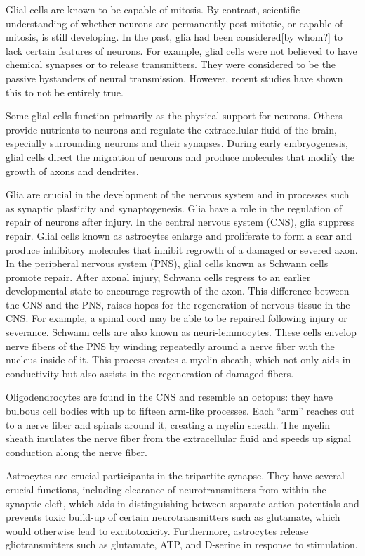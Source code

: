 \documentclass[]{book}
\begin{document}
Glial cells are known to be capable of mitosis. By contrast, scientific understanding of whether neurons are permanently post-mitotic, or capable of mitosis, is still developing. In the past, glia had been considered{[}by whom?{]} to lack certain features of neurons. For example, glial cells were not believed to have chemical synapses or to release transmitters. They were considered to be the passive bystanders of neural transmission. However, recent studies have shown this to not be entirely true.

Some glial cells function primarily as the physical support for neurons. Others provide nutrients to neurons and regulate the extracellular fluid of the brain, especially surrounding neurons and their synapses. During early embryogenesis, glial cells direct the migration of neurons and produce molecules that modify the growth of axons and dendrites.

Glia are crucial in the development of the nervous system and in processes such as synaptic plasticity and synaptogenesis. Glia have a role in the regulation of repair of neurons after injury. In the central nervous system (CNS), glia suppress repair. Glial cells known as astrocytes enlarge and proliferate to form a scar and produce inhibitory molecules that inhibit regrowth of a damaged or severed axon. In the peripheral nervous system (PNS), glial cells known as Schwann cells promote repair. After axonal injury, Schwann cells regress to an earlier developmental state to encourage regrowth of the axon. This difference between the CNS and the PNS, raises hopes for the regeneration of nervous tissue in the CNS. For example, a spinal cord may be able to be repaired following injury or severance. Schwann cells are also known as neuri-lemmocytes. These cells envelop nerve fibers of the PNS by winding repeatedly around a nerve fiber with the nucleus inside of it. This process creates a myelin sheath, which not only aids in conductivity but also assists in the regeneration of damaged fibers.

Oligodendrocytes are found in the CNS and resemble an octopus: they have bulbous cell bodies with up to fifteen arm-like processes. Each ``arm'' reaches out to a nerve fiber and spirals around it, creating a myelin sheath. The myelin sheath insulates the nerve fiber from the extracellular fluid and speeds up signal conduction along the nerve fiber.

Astrocytes are crucial participants in the tripartite synapse. They have several crucial functions, including clearance of neurotransmitters from within the synaptic cleft, which aids in distinguishing between separate action potentials and prevents toxic build-up of certain neurotransmitters such as glutamate, which would otherwise lead to excitotoxicity. Furthermore, astrocytes release gliotransmitters such as glutamate, ATP, and D-serine in response to stimulation.
\end{document}
